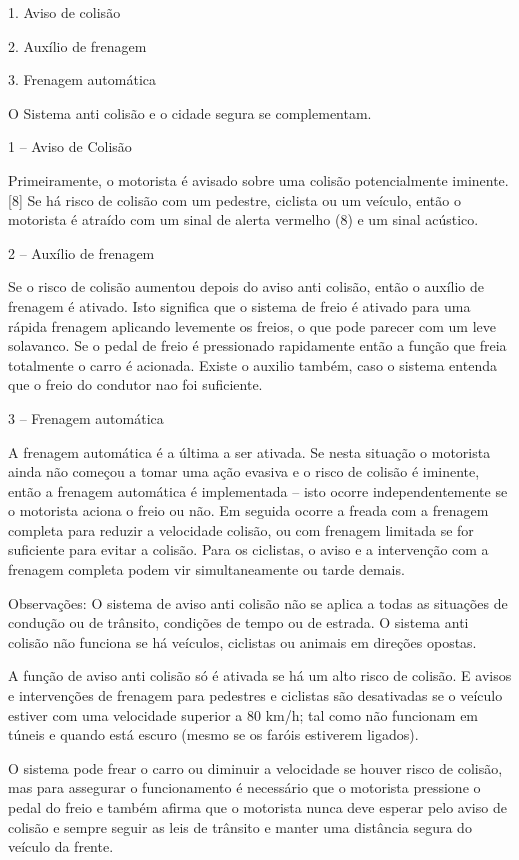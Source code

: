 \begin{enumerate}
1. Aviso de colisão

2. Auxílio de frenagem

3. Frenagem automática

O Sistema anti colisão e o cidade segura se complementam.

1 – Aviso de Colisão

Primeiramente, o motorista é avisado sobre uma colisão potencialmente iminente.
[8] Se há risco de colisão com um pedestre, ciclista ou um veículo, então o
motorista é atraído com um sinal de alerta vermelho (8) e um sinal acústico. \cite{8comper}

2 – Auxílio de frenagem

Se o risco de colisão aumentou depois do aviso anti colisão, então o auxílio de
frenagem é ativado. Isto significa que o sistema de freio é ativado para uma
rápida frenagem aplicando levemente os freios, o que pode parecer com um leve
solavanco. Se o pedal de freio é pressionado rapidamente então a função que
freia totalmente o carro é acionada. Existe o auxilio também, caso o sistema
entenda que o freio do condutor nao foi suficiente. \cite{8comper}

3 – Frenagem automática

A frenagem automática é a última a ser ativada. Se nesta situação o motorista
ainda não começou a tomar uma ação evasiva e o risco de colisão é iminente,
então a frenagem automática é implementada – isto ocorre independentemente se
o motorista aciona o freio ou não. Em seguida ocorre a freada com a frenagem
completa para reduzir a velocidade colisão, ou com frenagem limitada se for
suficiente para evitar a colisão. Para os ciclistas, o aviso e a intervenção
com a frenagem completa podem vir simultaneamente ou tarde demais. \cite{8comper}

Observações: O sistema de aviso anti colisão não se aplica a todas as
situações de condução ou de trânsito, condições de tempo ou de estrada.
O sistema anti colisão não funciona se há veículos, ciclistas ou animais
em direções opostas.

A função de aviso anti colisão só é ativada se há um alto risco de colisão.
E avisos e intervenções de frenagem para pedestres e ciclistas são desativadas
se o veículo estiver com uma velocidade superior a 80 km/h; tal como não
funcionam em túneis e quando está escuro (mesmo se os faróis estiverem ligados).

O sistema pode frear o carro ou diminuir a velocidade se houver risco de colisão,
mas para assegurar o funcionamento é necessário que o motorista pressione o pedal
do freio e também afirma que o motorista nunca deve esperar pelo aviso de colisão
e sempre seguir as leis de trânsito e manter uma distância segura do veículo da
frente. \cite{8comper}


\end{enumerate}
